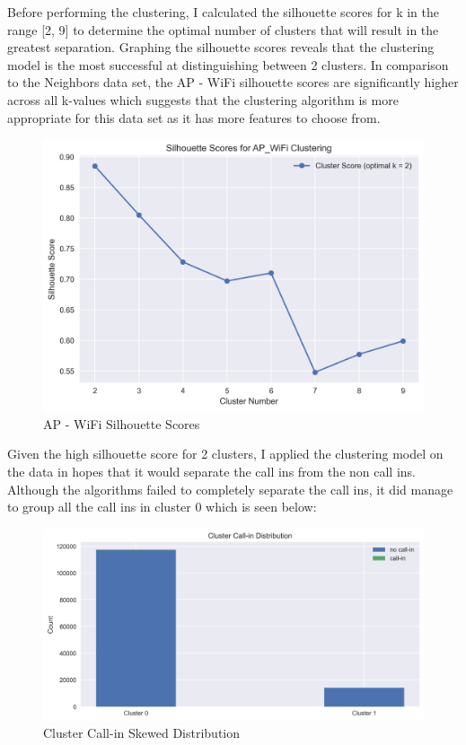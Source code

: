 \documentclass{article}
\begin{document}
\noindent
Before performing the clustering, I calculated the silhouette scores for k in the range [2, 9] to determine the optimal number of clusters that will result in the greatest separation. Graphing the silhouette scores reveals that the clustering model is the most successful at distinguishing between 2 clusters. In comparison to the Neighbors data set, the AP - WiFi silhouette scores are significantly higher across all k-values which suggests that the clustering algorithm is more appropriate for this data set as it has more features to choose from. 

\begin{figure}[htp]
    \centering
    \includegraphics[width=12cm]{visuals/silhouette_scores_ap_wifi.png}
    \caption{AP - WiFi Silhouette Scores}
\end{figure}

\newpage
\noindent
Given the high silhouette score for 2 clusters, I applied the clustering model on the data in hopes that it would separate the call ins from the non call ins. Although the algorithms failed to completely separate the call ins, it did manage to group all the call ins in cluster 0 which is seen below: 

\begin{figure}[htp]
    \centering
    \includegraphics[width=12cm]{visuals/cluster_call-in_distribution.png}
    \caption{Cluster Call-in Skewed Distribution}
\end{figure}
\end{document}

